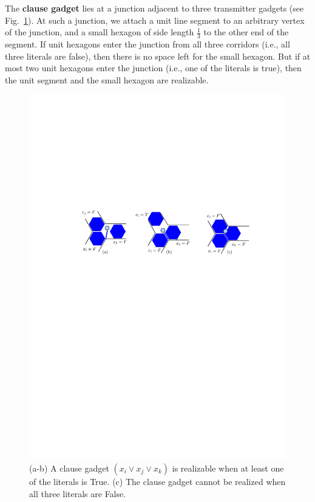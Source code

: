 \documentclass[runningheads]{article}
\begin{document}
The {\bf clause gadget} lies at a junction adjacent to three transmitter gadgets (see Fig.~\ref{fig:clause}). At such a junction, we attach a unit line segment to an arbitrary vertex of the junction, and a small hexagon of side length $\frac{1}{3}$ to the other end of the segment. If unit hexagons enter the junction from all three corridors (i.e., all three literals are false), then there is no space left for the small hexagon. But if at most two unit hexagons enter the junction (i.e., one of the literals is true), then the unit segment and the small hexagon are realizable.

\begin{figure}[htbp]
	\centering
	\includegraphics[width=0.7\columnwidth]{fig-clause-hex}
	\caption{(a-b) A clause gadget $(x_i\vee x_j\vee x_k)$ is
    realizable when at least one of the literals is {\sc True}.
    (c) The clause gadget cannot be realized when all three literals are {\sc False}.}
	\label{fig:clause}
\end{figure}
\end{document}
